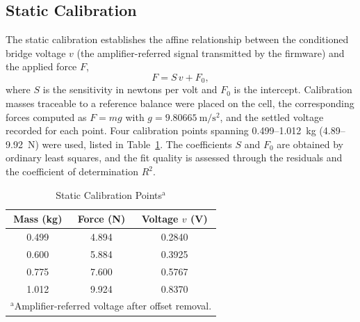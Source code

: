 \documentclass[conference]{IEEEtran}
\begin{document}
\subsection{Static Calibration}
The static calibration establishes the affine relationship between the conditioned bridge voltage $v$ (the amplifier-referred signal transmitted by the firmware) and the applied force $F$,
\begin{equation}
F = S\,v + F_{0},\label{eq:calib}
\end{equation}
where $S$ is the sensitivity in newtons per volt and $F_{0}$ is the intercept. Calibration masses traceable to a reference balance were placed on the cell, the corresponding forces computed as $F=mg$ with $g=9.80665~\mathrm{m/s^{2}}$, and the settled voltage recorded for each point. Four calibration points spanning 0.499--1.012~kg (4.89--9.92~N) were used, listed in Table~\ref{tab:calib}. The coefficients $S$ and $F_{0}$ are obtained by ordinary least squares, and the fit quality is assessed through the residuals and the coefficient of determination $R^{2}$.

\begin{table}[htbp]
\caption{Static Calibration Points$^{\mathrm{a}}$}
\begin{center}
\begin{tabular}{|c|c|c|}
\hline
\textbf{Mass (kg)} & \textbf{Force (N)} & \textbf{Voltage $v$ (V)} \\
\hline
0.499 & 4.894 & 0.2840 \\
\hline
0.600 & 5.884 & 0.3925 \\
\hline
0.775 & 7.600 & 0.5767 \\
\hline
1.012 & 9.924 & 0.8370 \\
\hline
\multicolumn{3}{l}{$^{\mathrm{a}}$Amplifier-referred voltage after offset removal.}
\end{tabular}
\label{tab:calib}
\end{center}
\end{table}
\end{document}
